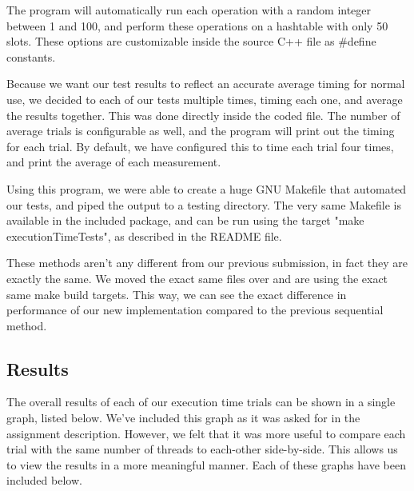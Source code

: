 \documentclass[journal]{IEEEtran}
\begin{document}
The program will automatically run each operation with a random integer between 1 and 100, and perform these operations on a hashtable with only 50 slots. These options are customizable inside the source C++ file as \#define constants.

Because we want our test results to reflect an accurate average timing for normal use, we decided to each of our tests multiple times, timing each one, and average the results together. This was done directly inside the coded file. The number of average trials is configurable as well, and the program will print out the timing for each trial. By default, we have configured this to time each trial four times, and print the average of each measurement.

Using this program, we were able to create a huge GNU Makefile that automated our tests, and piped the output to a testing directory. The very same Makefile is available in the included package, and can be run using the target "make executionTimeTests", as described in the README file.

These methods aren't any different from our previous submission, in fact they are exactly the same. We moved the exact same files over and are using the exact same make build targets. This way, we can see the exact difference in performance of our new implementation compared to the previous sequential method.

\subsection{Results}

The overall results of each of our execution time trials can be shown in a single graph, listed below. We've included this graph as it was asked for in the assignment description. However, we felt that it was more useful to compare each trial with the same number of threads to each-other side-by-side. This allows us to view the results in a more meaningful manner. Each of these graphs have been included below.
\end{document}
